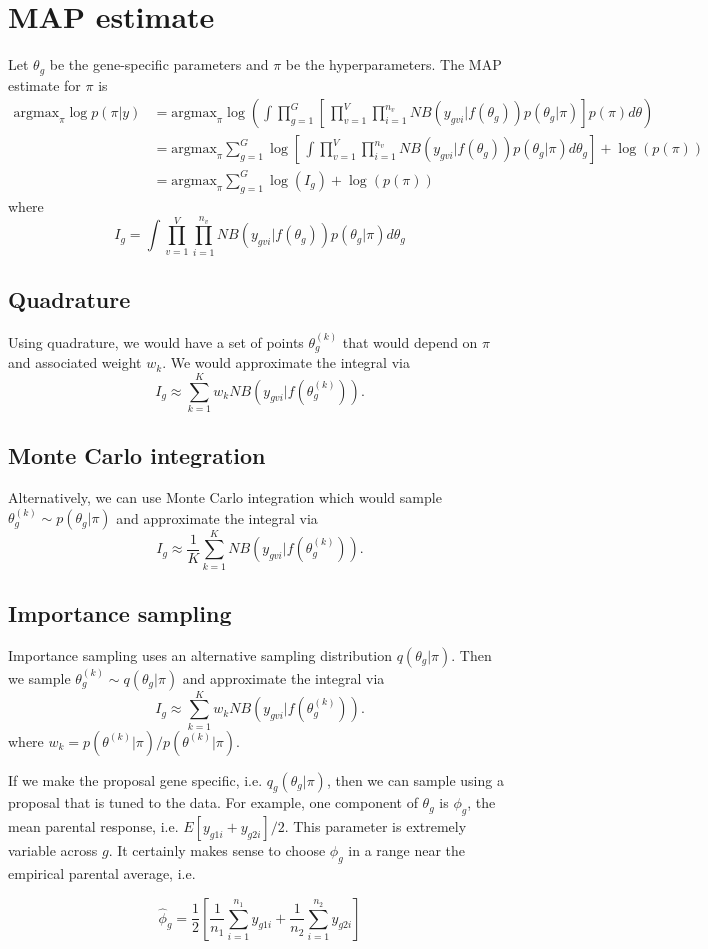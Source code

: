 \documentclass{article}
\newcommand{\argmax}{\mbox{argmax}}
\begin{document}
\section{MAP estimate}

Let $\theta_g$ be the gene-specific parameters and $\pi$ be the hyperparameters. The MAP estimate for $\pi$ is 
\begin{align*}
\argmax_{\pi} \log p(\pi|y) 
&= \argmax_{\pi} \log\left( \int \prod_{g=1}^G \left[ \, \prod_{v=1}^V \prod_{i=1}^{n_v} NB(y_{gvi}|f(\theta_g)) p(\theta_g|\pi) \right] p(\pi) d\theta \right) \\
&= \argmax_{\pi}\sum_{g=1}^G \log \left[ \, \int \prod_{v=1}^V \prod_{i=1}^{n_v} NB(y_{gvi}| f(\theta_g)) p(\theta_g|\pi) d\theta_g  \right] + \log(p(\pi)) \\
&= \argmax_{\pi}\sum_{g=1}^G \log(I_g) + \log(p(\pi)) 
\end{align*}
where 
 \[
 I_g = \int \prod_{v=1}^V \prod_{i=1}^{n_v} NB(y_{gvi}| f(\theta_g)) p(\theta_g|\pi) d\theta_g
 \]

\subsection{Quadrature}

Using quadrature, we would have a set of points $\theta_g^{(k)}$ that would depend on $\pi$ and associated weight $w_k$. We would approximate the integral via 
\[
I_g \approx \sum_{k=1}^K w_k NB(y_{gvi}| f(\theta_g^{(k)})).
\]

\subsection{Monte Carlo integration}

Alternatively, we can use Monte Carlo integration which would sample $\theta_g^{(k)} \sim p(\theta_g|\pi)$ and approximate the integral via 
\[
I_g \approx \frac{1}{K} \sum_{k=1}^K NB(y_{gvi}| f(\theta_g^{(k)})).
\]


\subsection{Importance sampling}

Importance sampling uses an alternative sampling distribution $q(\theta_g|\pi)$. Then we sample $\theta_g^{(k)} \sim q(\theta_g|\pi)$ and approximate the integral via 
\[
I_g \approx \sum_{k=1}^K w_k NB(y_{gvi}| f(\theta_g^{(k)})).
\]
where $w_k = p(\theta^{(k)}|\pi)/p(\theta^{(k)}|\pi)$. 

If we make the proposal gene specific, i.e. $q_g(\theta_g|\pi)$, then we can sample using a proposal that is tuned to the data. For example, one component of $\theta_g$ is $\phi_g$, the mean parental response, i.e. $E[y_{g1i}+y_{g2i}]/2$. This parameter is extremely variable across $g$. It certainly makes sense to choose $\phi_g$ in a range near the empirical parental average, i.e. 

\[ \hat{\phi}_g = \frac{1}{2}\left[ \frac{1}{n_1} \sum_{i=1}^{n_1} y_{g1i} + \frac{1}{n_2} \sum_{i=1}^{n_2} y_{g2i} \right] \]
\end{document}
